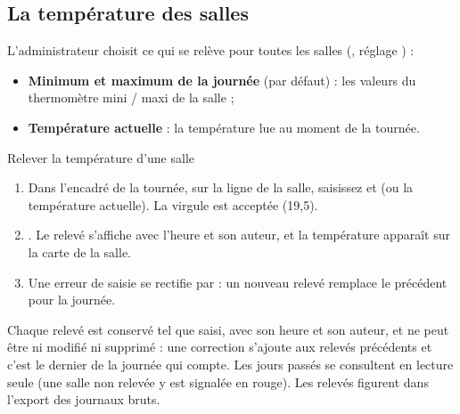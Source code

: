\documentclass[11pt,a4paper]{article}
\begin{document}
\subsection*{La température des salles}
L'administrateur choisit ce qui se relève pour toutes les salles
(, réglage ) :
\begin{itemize}
  \item \textbf{Minimum et maximum de la journée} (par défaut) : les valeurs
    du thermomètre mini / maxi de la salle ;
  \item \textbf{Température actuelle} : la température lue au moment de la
    tournée.
\end{itemize}
\begin{procedure}{Relever la température d'une salle}
\begin{enumerate}
  \item Dans l'encadré  de la tournée, sur la
    ligne de la salle, saisissez  et  (ou la
    température actuelle). La virgule est acceptée (19,5).
  \item {}. Le relevé s'affiche avec l'heure et son auteur,
    et la température apparaît sur la carte de la salle.
  \item Une erreur de saisie se rectifie par  : un nouveau
    relevé remplace le précédent pour la journée.
\end{enumerate}
\end{procedure}
\begin{trace}
Chaque relevé est conservé tel que saisi, avec son heure et son auteur, et
ne peut être ni modifié ni supprimé : une correction s'ajoute aux relevés
précédents et c'est le dernier de la journée qui compte. Les jours passés se
consultent en lecture seule (une salle non relevée y est signalée en rouge).
Les relevés figurent dans l'export des journaux bruts.
\end{trace}
\end{document}
